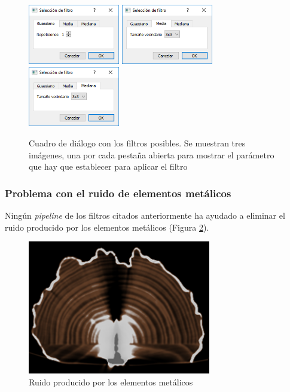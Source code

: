 \begin{figure}[H]
	\centering
	\includegraphics[width=4cm]{imagenes/desarrollo/gui-filtro-gaussiano}
	\includegraphics[width=4cm]{imagenes/desarrollo/gui-filtro-media}
	\includegraphics[width=4cm]{imagenes/desarrollo/gui-filtro-mediana}
	\caption{Cuadro de diálogo con los filtros posibles. Se muestran tres imágenes, una por cada pestaña abierta para mostrar el parámetro que hay que establecer para aplicar el filtro}
	\label{fig:desarrollo/gui-filtro-dialogo}
\end{figure}

\subsubsection{Problema con el ruido de elementos metálicos}

Ningún \textit{pipeline} de los filtros citados anteriormente ha ayudado a eliminar el ruido producido por los elementos metálicos (Figura \ref{fig:desarrollo/ruido-clavo}).

\begin{figure}[H]
	\centering
	\includegraphics[width=8cm]{imagenes/desarrollo/ruido-clavo}
	\caption{Ruido producido por los elementos metálicos}
	\label{fig:desarrollo/ruido-clavo}
\end{figure}

